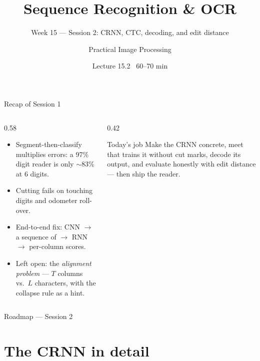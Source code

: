 \documentclass[10pt,aspectratio=169]{beamer}
\title{Sequence Recognition \& OCR}
\subtitle{Week 15 — Session 2: CRNN, CTC, decoding, and edit distance}
\author{Practical Image Processing}
\date{Lecture 15.2 \textbullet\ 60--70 min}
\begin{document}
\maketitle

\begin{frame}{Recap of Session 1}
  \begin{columns}[T]
    \begin{column}{0.58\textwidth}
      \begin{itemize}
        \item Segment-then-classify multiplies errors: a 97\% digit reader is only $\sim$83\% at 6 digits.
        \item Cutting fails on touching digits and odometer roll-over.
        \item End-to-end fix: CNN $\rightarrow$ a sequence of  $\rightarrow$ RNN $\rightarrow$ per-column scores.
        \item Left open: the \emph{alignment problem} --- $T$ columns vs.\ $L$ characters, with the collapse rule as a hint.
      \end{itemize}
    \end{column}
    \begin{column}{0.42\textwidth}
      \begin{alertblock}{Today's job}
        Make the CRNN concrete, meet  that trains it without cut marks, decode its output,
        and evaluate honestly with edit distance --- then ship the reader.
      \end{alertblock}
    \end{column}
  \end{columns}
\end{frame}

\begin{frame}{Roadmap --- Session 2}\tableofcontents\end{frame}

\section{The CRNN in detail}
\end{document}
